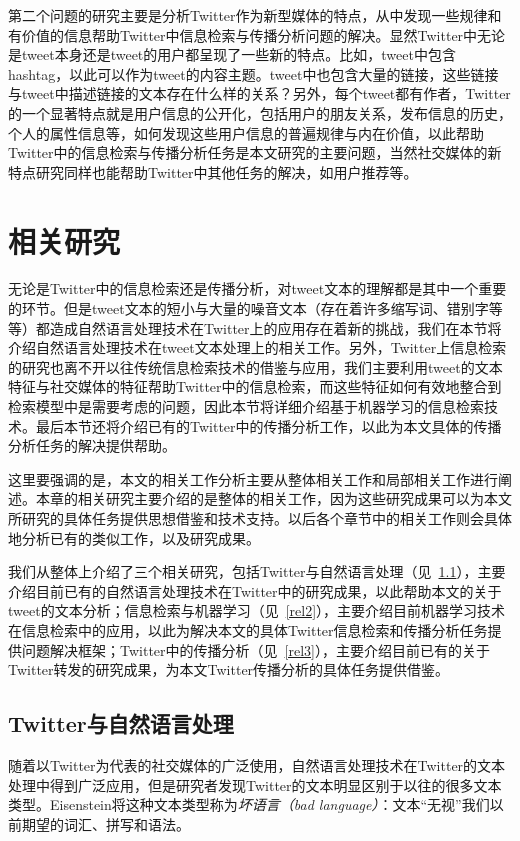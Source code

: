 第二个问题的研究主要是分析Twitter作为新型媒体的特点，从中发现一些规律和有价值的信息帮助Twitter中信息检索与传播分析问题的解决。显然Twitter中无论是tweet本身还是tweet的用户都呈现了一些新的特点。比如，tweet中包含hashtag，以此可以作为tweet的内容主题。tweet中也包含大量的链接，这些链接与tweet中描述链接的文本存在什么样的关系？另外，每个tweet都有作者，Twitter的一个显著特点就是用户信息的公开化，包括用户的朋友关系，发布信息的历史，个人的属性信息等，如何发现这些用户信息的普遍规律与内在价值，以此帮助Twitter中的信息检索与传播分析任务是本文研究的主要问题，当然社交媒体的新特点研究同样也能帮助Twitter中其他任务的解决，如用户推荐等。

\section{相关研究}
无论是Twitter中的信息检索还是传播分析，对tweet文本的理解都是其中一个重要的环节。但是tweet文本的短小与大量的噪音文本（存在着许多缩写词、错别字等等）都造成自然语言处理技术在Twitter上的应用存在着新的挑战，我们在本节将介绍自然语言处理技术在tweet文本处理上的相关工作。另外，Twitter上信息检索的研究也离不开以往传统信息检索技术的借鉴与应用，我们主要利用tweet的文本特征与社交媒体的特征帮助Twitter中的信息检索，而这些特征如何有效地整合到检索模型中是需要考虑的问题，因此本节将详细介绍基于机器学习的信息检索技术。最后本节还将介绍已有的Twitter中的传播分析工作，以此为本文具体的传播分析任务的解决提供帮助。

这里要强调的是，本文的相关工作分析主要从整体相关工作和局部相关工作进行阐述。本章的相关研究主要介绍的是整体的相关工作，因为这些研究成果可以为本文所研究的具体任务提供思想借鉴和技术支持。以后各个章节中的相关工作则会具体地分析已有的类似工作，以及研究成果。

我们从整体上介绍了三个相关研究，包括Twitter与自然语言处理（见~\ref{rel1}），主要介绍目前已有的自然语言处理技术在Twitter中的研究成果，以此帮助本文的关于tweet的文本分析；信息检索与机器学习（见~\ref{rel2}），主要介绍目前机器学习技术在信息检索中的应用，以此为解决本文的具体Twitter信息检索和传播分析任务提供问题解决框架；Twitter中的传播分析（见~\ref{rel3}），主要介绍目前已有的关于Twitter转发的研究成果，为本文Twitter传播分析的具体任务提供借鉴。

\subsection{Twitter与自然语言处理}
\label{rel1}
随着以Twitter为代表的社交媒体的广泛使用，自然语言处理技术在Twitter的文本处理中得到广泛应用，但是研究者发现Twitter的文本明显区别于以往的很多文本类型。Eisenstein将这种文本类型称为\emph{坏语言（bad language）}：文本“无视”我们以前期望的词汇、拼写和语法。

